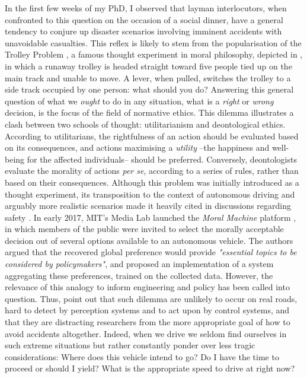 In the first few weeks of my PhD, I observed that layman interlocutors, when confronted to this question on the occasion of a social dinner, have a general tendency to conjure up disaster scenarios involving imminent accidents with unavoidable casualties. This reflex is likely to stem from the popularisation of the Trolley Problem \citep{Foot1967}, a famous thought experiment in moral philosophy, depicted in , in which a runaway trolley is headed straight toward five people tied up on the main track and unable to move. A lever, when pulled, switches the trolley to a side track occupied by one person: what should you do? Answering this general question of what we \emph{ought} to do in any situation, what is a \emph{right} or \emph{wrong} decision, is the focus of the field of {normative ethics}. This dilemma illustrates a clash between two schools of thought: utilitarianism and deontological ethics. According to utilitarians, the rightfulness of an action should be evaluated based on its consequences, and actions maximising a \emph{utility} --the happiness and well-being for the affected individuals-- should be preferred. Conversely, deontologists evaluate the morality of actions \emph{per se}, according to a series of rules, rather than based on their consequences. Although this problem was initially introduced as a thought experiment, its transposition to the context of autonomous driving and arguably more realistic scenarios made it heavily cited in discussions regarding safety \citep[e.g.][]{Lin2015,Bonnefon2016,Gogoll2017}. In early 2017, MIT’s Media Lab launched the \emph{Moral Machine} platform \citep{Awad2018}, in which members of the public were invited to select the morally acceptable decision out of several options available to an autonomous vehicle. The authors argued that the recovered global preference would provide \emph{"essential topics to be considered by policymakers"}, and \citep{Noothigattu2018} proposed an implementation of a system aggregating these preferences, trained on the collected data. However, the relevance of this analogy to inform engineering and policy has been called into question. Thus, \citet{DeFreitas2019} point out that such dilemma are unlikely to occur on real roads, hard to detect by perception systems and to act upon by control systems, and that they are distracting researchers from the more appropriate goal of how to avoid accidents altogether. Indeed, when we drive we seldom find ourselves in such extreme situations but rather constantly ponder over less tragic considerations: Where does this vehicle intend to go? Do I have the time to proceed or should I yield? What is the appropriate speed to drive at right now? 

